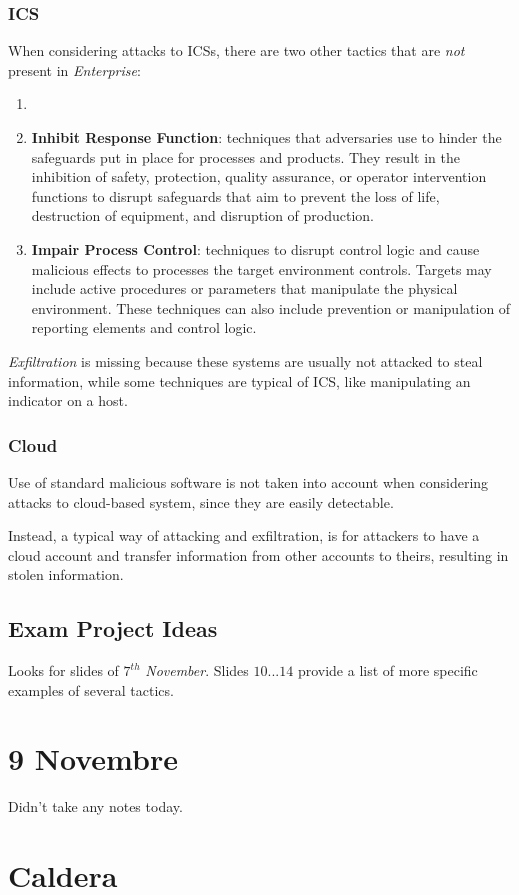 \subsubsection{ICS}
When considering attacks to ICSs,
there are two other tactics that are \textit{not} present in \textit{Enterprise}:
\begin{enumerate}
   \item 
   \item \textbf{Inhibit Response Function}:
   techniques that adversaries use to hinder the
   safeguards put in place for processes and products.
   They result in the inhibition of
   safety, protection, quality assurance, or operator intervention functions to
   disrupt safeguards that aim to prevent the loss of life, destruction of
   equipment, and disruption of production.
   \item \textbf{Impair Process Control}:
   techniques to disrupt control logic and cause
   malicious effects to processes the target environment controls. 
   Targets may include active procedures or parameters that manipulate the
   physical environment. These techniques can also include prevention or
   manipulation of reporting elements and control logic.
\end{enumerate}

\textit{Exfiltration} is missing because these systems are usually not attacked to steal information,
while some techniques are typical of ICS,
like manipulating an indicator on a host.

\subsubsection{Cloud}
Use of standard malicious software is not taken into account when considering attacks to cloud-based system,
since they are easily detectable.

Instead, a typical way of attacking and exfiltration,
is for attackers to have a cloud account and transfer information from other accounts to theirs,
resulting in stolen information.

\subsection{Exam Project Ideas}
Looks for slides of $7^{th}$ \textit{November}.
Slides $10...14$ provide a list of more specific examples of several tactics.

\section{9 Novembre}
Didn't take any notes today.
\section{Caldera}